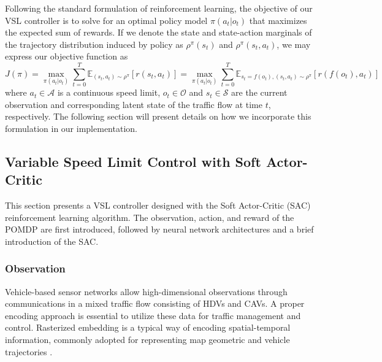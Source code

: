 \documentclass[11pt, letterpaper]{article}
\begin{document}
Following the standard formulation of reinforcement learning, the objective of our VSL controller is to solve for an optimal policy model $\pi(a_t|o_t)$ that maximizes the expected sum of rewards. If we denote the state and state-action marginals of the trajectory distribution induced by policy as $\rho^\pi(s_t)$ and $\rho^\pi(s_t, a_t)$, we may express our objective function as
\begin{equation}
J(\pi)=\max_{\pi(a_t|o_t)}\sum_{t=0}^T\mathbb{E}_{(s_t, a_t)\sim\rho^\pi}\left[r(s_t, a_t)\right]=\max_{\pi(a_t|o_t)}\sum_{t=0}^T\mathbb{E}_{s_t=f(o_t), (s_t, a_t)\sim\rho^\pi}\left[r\left(f(o_t), a_t\right)\right]
\end{equation}
where $a_t\in\mathcal{A}$ is a continuous speed limit, $o_t\in\mathcal{O}$ and $s_t\in\mathcal{S}$ are the current observation and corresponding latent state of the traffic flow at time $t$, respectively. The following section will present details on how we incorporate this formulation in our implementation.

\subsection{Variable Speed Limit Control with Soft Actor-Critic}

This section presents a VSL controller designed with the Soft Actor-Critic (SAC) reinforcement learning algorithm. The observation, action, and reward of the POMDP are first introduced, followed by neural network architectures and a brief introduction of the SAC.

\subsubsection{Observation}

Vehicle-based sensor networks allow high-dimensional observations through communications in a mixed traffic flow consisting of HDVs and CAVs. A proper encoding approach is essential to utilize these data for traffic management and control. Rasterized embedding is a typical way of encoding spatial-temporal information, commonly adopted for representing map geometric and vehicle trajectories \citep{https://doi.org/10.48550/arxiv.2006.14480}.
\end{document}
